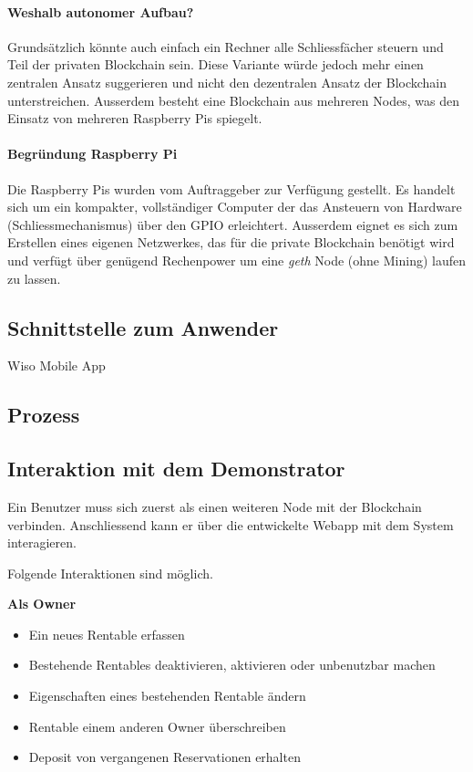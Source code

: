 \paragraph{Weshalb autonomer Aufbau?}
Grundsätzlich könnte auch einfach ein Rechner alle Schliessfächer steuern und Teil der privaten Blockchain sein. Diese Variante würde jedoch mehr einen zentralen Ansatz suggerieren und nicht den dezentralen Ansatz der Blockchain unterstreichen. Ausserdem besteht eine Blockchain aus mehreren Nodes, was den Einsatz von mehreren Raspberry Pis spiegelt. 
\paragraph{Begründung Raspberry Pi}
Die Raspberry Pis wurden vom Auftraggeber zur Verfügung gestellt. Es handelt sich um ein kompakter, vollständiger Computer der das Ansteuern von Hardware (Schliessmechanismus) über den GPIO erleichtert. Ausserdem eignet es sich zum Erstellen eines eigenen Netzwerkes, das für die private Blockchain benötigt wird und verfügt über genügend Rechenpower um eine \emph{geth} Node (ohne Mining) laufen zu lassen.

\subsection{Schnittstelle zum Anwender}

Wiso Mobile App


\subsection{Prozess}


\subsection{Interaktion mit dem Demonstrator}
\label{sec:Interaktion mit dem Demonstrator}

Ein Benutzer muss sich zuerst als einen weiteren Node mit der Blockchain verbinden. Anschliessend kann er über die entwickelte Webapp mit dem System interagieren.

\vspace{1em}\noindent
Folgende Interaktionen sind möglich.

\vspace{1em}\noindent
\textbf{Als Owner}
\begin{itemize}
    \item Ein neues Rentable erfassen
    \item Bestehende Rentables deaktivieren, aktivieren oder unbenutzbar machen
    \item Eigenschaften eines bestehenden Rentable ändern
    \item Rentable einem anderen Owner überschreiben
    \item Deposit von vergangenen Reservationen erhalten
\end{itemize}

